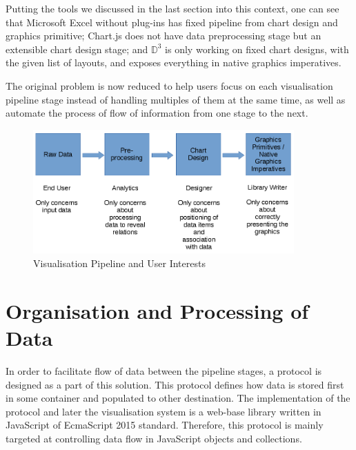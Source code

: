 \documentclass[11pt, a4paper]{report}
\begin{document}
Putting the tools we discussed in the last section into this context, one can see that Microsoft Excel without plug-ins has fixed pipeline from chart design and graphics primitive; Chart.js does not have data preprocessing stage but an extensible chart design stage; and $\mathbb D^3$ is only working on fixed chart designs, with the given list of layouts, and exposes everything in native graphics imperatives.

The original problem is now reduced to help users focus on each visualisation pipeline stage instead of handling multiples of them at the same time, as well as automate the process of flow of information from one stage to the next.
\begin{figure}[H]
\centering
\includegraphics[width=10cm]{fig3_pipeline_user}
\caption{Visualisation Pipeline and User Interests}
\label{fig:pipeline_user}
\end{figure}
\section[Data and process containers]{Organisation and Processing of Data}
In order to facilitate flow of data between the pipeline stages, a protocol is designed as a part of this solution. This protocol defines how data is stored first in some container and populated to other destination. The implementation of the protocol and later the visualisation system is a web-base library written in JavaScript of EcmaScript 2015 standard. Therefore, this protocol is mainly targeted at controlling data flow in JavaScript objects and collections.
\end{document}
